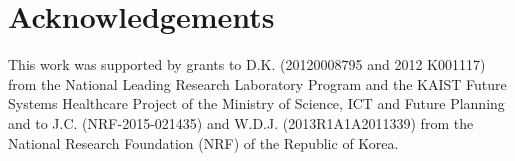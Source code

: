 \section*{Acknowledgements}

This work was supported by grants to D.K. (20120008795 and 2012 K001117) from the National Leading Research Laboratory Program and the KAIST Future Systems Healthcare Project of the Ministry of Science, ICT and Future Planning and to J.C. (NRF-2015-021435) and W.D.J. (2013R1A1A2011339) from the National Research Foundation (NRF) of the Republic of Korea.